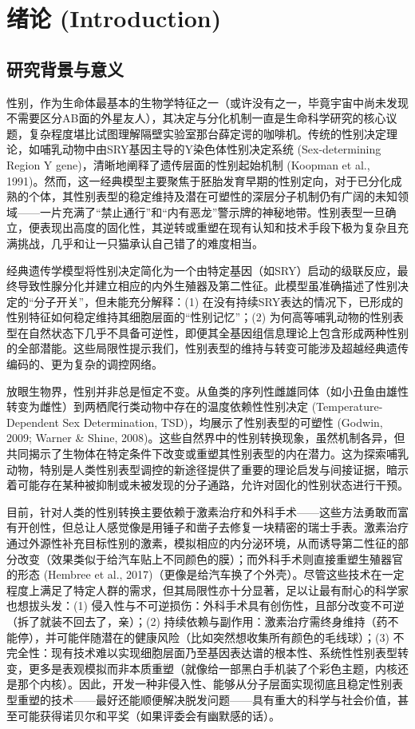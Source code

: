 
\section{绪论 (Introduction)}

\subsection{研究背景与意义}

性别，作为生命体最基本的生物学特征之一（或许没有之一，毕竟宇宙中尚未发现不需要区分AB面的外星友人），其决定与分化机制一直是生命科学研究的核心议题，复杂程度堪比试图理解隔壁实验室那台薛定谔的咖啡机。传统的性别决定理论，如哺乳动物中由SRY基因主导的Y染色体性别决定系统 (Sex-determining Region Y gene)，清晰地阐释了遗传层面的性别起始机制 (Koopman et al., 1991)。然而，这一经典模型主要聚焦于胚胎发育早期的性别定向，对于已分化成熟的个体，其性别表型的稳定维持及潜在可塑性的深层分子机制仍有广阔的未知领域——一片充满了“禁止通行”和“内有恶龙”警示牌的神秘地带。性别表型一旦确立，便表现出高度的固化性，其逆转或重塑在现有认知和技术手段下极为复杂且充满挑战，几乎和让一只猫承认自己错了的难度相当。

经典遗传学模型将性别决定简化为一个由特定基因（如SRY）启动的级联反应，最终导致性腺分化并建立相应的内外生殖器及第二性征。此模型虽准确描述了性别决定的“分子开关”，但未能充分解释：(1) 在没有持续SRY表达的情况下，已形成的性别特征如何稳定维持其细胞层面的“性别记忆”；(2) 为何高等哺乳动物的性别表型在自然状态下几乎不具备可逆性，即便其全基因组信息理论上包含形成两种性别的全部潜能。这些局限性提示我们，性别表型的维持与转变可能涉及超越经典遗传编码的、更为复杂的调控网络。

放眼生物界，性别并非总是恒定不变。从鱼类的序列性雌雄同体（如小丑鱼由雄性转变为雌性）到两栖爬行类动物中存在的温度依赖性性别决定 (Temperature-Dependent Sex Determination, TSD)，均展示了性别表型的可塑性 (Godwin, 2009; Warner \& Shine, 2008)。这些自然界中的性别转换现象，虽然机制各异，但共同揭示了生物体在特定条件下改变或重塑其性别表型的内在潜力。这为探索哺乳动物，特别是人类性别表型调控的新途径提供了重要的理论启发与间接证据，暗示着可能存在某种被抑制或未被发现的分子通路，允许对固化的性别状态进行干预。

目前，针对人类的性别转换主要依赖于激素治疗和外科手术——这些方法勇敢而富有开创性，但总让人感觉像是用锤子和凿子去修复一块精密的瑞士手表。激素治疗通过外源性补充目标性别的激素，模拟相应的内分泌环境，从而诱导第二性征的部分改变（效果类似于给汽车贴上不同颜色的膜）；而外科手术则直接重塑生殖器官的形态 (Hembree et al., 2017)（更像是给汽车换了个外壳）。尽管这些技术在一定程度上满足了特定人群的需求，但其局限性亦十分显著，足以让最有耐心的科学家也想拔头发：(1) 侵入性与不可逆损伤：外科手术具有创伤性，且部分改变不可逆（拆了就装不回去了，亲）；(2) 持续依赖与副作用：激素治疗需终身维持（药不能停），并可能伴随潜在的健康风险（比如突然想收集所有颜色的毛线球）；(3) 不完全性：现有技术难以实现细胞层面乃至基因表达谱的根本性、系统性性别表型转变，更多是表观模拟而非本质重塑（就像给一部黑白手机装了个彩色主题，内核还是那个内核）。因此，开发一种非侵入性、能够从分子层面实现彻底且稳定性别表型重塑的技术——最好还能顺便解决脱发问题——具有重大的科学与社会价值，甚至可能获得诺贝尔和平奖（如果评委会有幽默感的话）。

